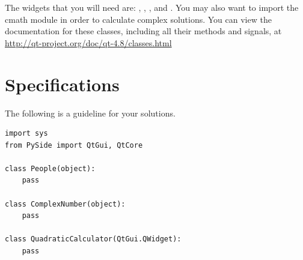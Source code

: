\begin{problem}
\begin{figure}[H]
\begin{subfigure}[b]{.49\textwidth}
\end{subfigure}
\end{figure}
The widgets that you will need are: , , , and . You may also want to import the cmath module in order to calculate complex solutions.
You can view the documentation for these classes, including all their methods and signals, at \url{http://qt-project.org/doc/qt-4.8/classes.html}
\label{prob:quadCalc}
\end{problem}


\section*{Specifications}

The following is a guideline for your solutions.

\begin{lstlisting}
import sys
from PySide import QtGui, QtCore

class People(object):
	pass
	
class ComplexNumber(object):
	pass
	
class QuadraticCalculator(QtGui.QWidget):
	pass
\end{lstlisting}